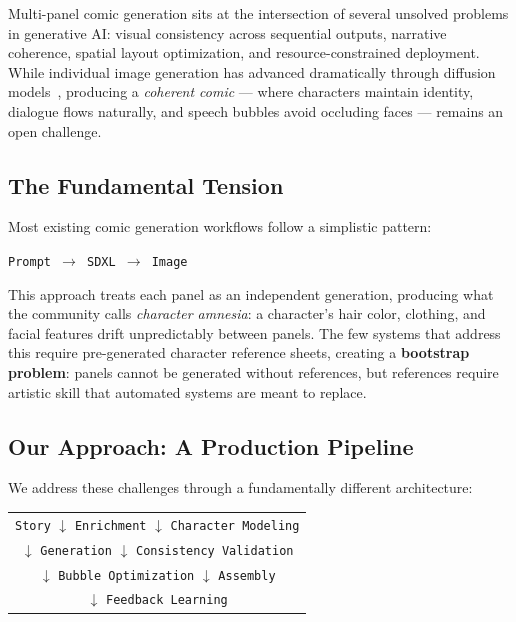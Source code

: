 \documentclass[11pt,a4paper,twocolumn]{article}
\begin{document}
Multi-panel comic generation sits at the intersection of several unsolved problems in generative AI: visual consistency across sequential outputs, narrative coherence, spatial layout optimization, and resource-constrained deployment. While individual image generation has advanced dramatically through diffusion models~\cite{rombach2022}, producing a \textit{coherent comic} --- where characters maintain identity, dialogue flows naturally, and speech bubbles avoid occluding faces --- remains an open challenge.

\subsection{The Fundamental Tension}

Most existing comic generation workflows follow a simplistic pattern:

\begin{center}
\texttt{Prompt $\rightarrow$ SDXL $\rightarrow$ Image}
\end{center}

\noindent This approach treats each panel as an independent generation, producing what the community calls \textit{character amnesia}: a character's hair color, clothing, and facial features drift unpredictably between panels. The few systems that address this require pre-generated character reference sheets, creating a \textbf{bootstrap problem}: panels cannot be generated without references, but references require artistic skill that automated systems are meant to replace.

\subsection{Our Approach: A Production Pipeline}

We address these challenges through a fundamentally different architecture:

\begin{center}
\footnotesize
\begin{tabular}{c}
\texttt{Story} $\downarrow$ \texttt{Enrichment} $\downarrow$ \texttt{Character Modeling} \\
$\downarrow$ \texttt{Generation} $\downarrow$ \texttt{Consistency Validation} \\
$\downarrow$ \texttt{Bubble Optimization} $\downarrow$ \texttt{Assembly} \\
$\downarrow$ \texttt{Feedback Learning}
\end{tabular}
\end{center}
\end{document}
